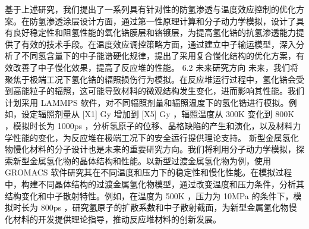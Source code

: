基于上述研究，我们提出了一系列具有针对性的防氢渗透与温度效应控制的优化方案。在防氢渗透涂层设计方面，通过第一性原理计算和分子动力学模拟，设计了具有良好稳定性和阻氢性能的氧化锆膜层和铬镀层，为提高氢化锆的抗氢渗透能力提供了有效的技术手段。在温度效应调控策略方面，通过建立中子输运模型，深入分析了不同氢含量下的中子能谱硬化规律，提出了采用复合慢化结构的优化方案，有效改善了中子慢化效果，提高了反应堆的性能。
6.2 未来研究方向
未来，我们将聚焦于极端工况下氢化锆的辐照损伤行为模拟。在反应堆运行过程中，氢化锆会受到高能粒子的辐照，这可能导致材料的微观结构发生变化，进而影响其性能。我们计划采用 LAMMPS 软件，对不同辐照剂量和辐照温度下的氢化锆进行模拟。例如，设定辐照剂量从 [X1] Gy 增加到 [X5] Gy ，辐照温度从 300K 变化到 800K ，模拟时长为 1000ps ，分析氢原子的位移、晶格缺陷的产生和演化，以及材料力学性能的变化，为反应堆在极端工况下的安全运行提供理论支持。
新型金属氢化物慢化材料的分子设计也是未来的重要研究方向。我们将利用分子动力学模拟，探索新型金属氢化物的晶体结构和性能。以新型过渡金属氢化物为例，使用 GROMACS 软件研究其在不同温度和压力下的稳定性和慢化性能。在模拟过程中，构建不同晶体结构的过渡金属氢化物模型，通过改变温度和压力条件，分析其结构变化和中子散射特性。例如，在温度为 500K ，压力为 10MPa 的条件下，模拟时长为 800ps ，研究氢原子的扩散系数和中子散射截面，为新型金属氢化物慢化材料的开发提供理论指导，推动反应堆材料的创新发展。

